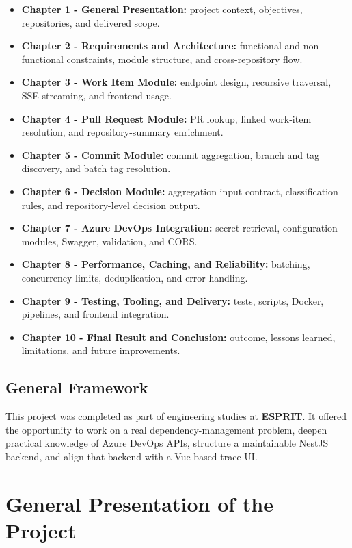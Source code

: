\documentclass[12pt,a4paper]{report}
\begin{document}
\begin{itemize}
  \item \textbf{Chapter 1 - General Presentation:} project context, objectives, repositories, and delivered scope.
  \item \textbf{Chapter 2 - Requirements and Architecture:} functional and non-functional constraints, module structure, and cross-repository flow.
  \item \textbf{Chapter 3 - Work Item Module:} endpoint design, recursive traversal, SSE streaming, and frontend usage.
  \item \textbf{Chapter 4 - Pull Request Module:} PR lookup, linked work-item resolution, and repository-summary enrichment.
  \item \textbf{Chapter 5 - Commit Module:} commit aggregation, branch and tag discovery, and batch tag resolution.
  \item \textbf{Chapter 6 - Decision Module:} aggregation input contract, classification rules, and repository-level decision output.
  \item \textbf{Chapter 7 - Azure DevOps Integration:} secret retrieval, configuration modules, Swagger, validation, and CORS.
  \item \textbf{Chapter 8 - Performance, Caching, and Reliability:} batching, concurrency limits, deduplication, and error handling.
  \item \textbf{Chapter 9 - Testing, Tooling, and Delivery:} tests, scripts, Docker, pipelines, and frontend integration.
  \item \textbf{Chapter 10 - Final Result and Conclusion:} outcome, lessons learned, limitations, and future improvements.
\end{itemize}

\section*{General Framework}

This project was completed as part of engineering studies at \textbf{ESPRIT}. It
offered the opportunity to work on a real dependency-management problem, deepen
practical knowledge of Azure DevOps APIs, structure a maintainable NestJS backend,
and align that backend with a Vue-based trace UI.

\chapter{General Presentation of the Project}
\startcontents
\printcontents{}{}{}
\newpage
\end{document}
